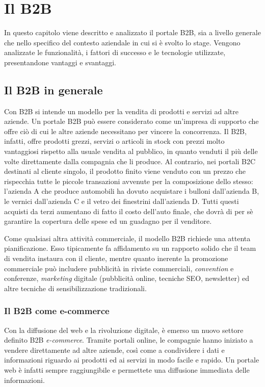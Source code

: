 \chapter{Il B2B}
\begin{flushright}
	\parbox{13cm}{\small In questo capitolo viene descritto e analizzato il portale B2B, sia a livello generale che nello specifico del contesto aziendale in cui si è svolto lo stage. Vengono analizzate le funzionalità, i fattori di successo e le tecnologie utilizzate, presentandone vantaggi e svantaggi.}
\end{flushright}
\section{Il B2B in generale}
Con B2B si intende un modello per la vendita di prodotti e servizi ad altre aziende. Un portale B2B può essere considerato come un'impresa di supporto che offre ciò di cui le altre aziende necessitano per vincere la concorrenza. Il B2B, infatti, offre prodotti grezzi, servizi o articoli in stock con prezzi molto vantaggiosi rispetto alla usuale vendita al pubblico, in quanto venduti il più delle volte direttamente dalla compagnia che li produce. Al contrario, nei portali B2C destinati al cliente singolo, il prodotto finito viene venduto con un prezzo che rispecchia tutte le piccole transazioni avvenute per la composizione dello stesso: l'azienda A che produce automobili ha dovuto acquistare i bulloni dall'azienda B, le vernici dall'azienda C e il vetro dei finestrini dall'azienda D. Tutti questi acquisti da terzi aumentano di fatto il costo dell'auto finale, che dovrà di per sè garantire la copertura delle spese ed un guadagno per il venditore.

Come qualsiasi altra attività commerciale, il modello B2B richiede una attenta pianificazione. Esso tipicamente fa affidamento su un rapporto solido che il team di vendita instaura con il cliente, mentre quanto inerente la promozione commerciale può includere pubblicità in riviste commerciali, \textit{convention} e conferenze, \textit{marketing} digitale (pubblicità online, tecniche SEO, newsletter) ed altre tecniche di sensibilizzazione tradizionali.

\subsection{Il B2B come e-commerce}
Con la diffusione del web e la rivoluzione digitale, è emerso un nuovo settore definito B2B \textit{e-commerce}. Tramite portali online, le compagnie hanno iniziato a vendere direttamente ad altre aziende, così come a condividere i dati e informazioni riguardo ai prodotti ed ai servizi in modo facile e rapido. Un portale web è infatti sempre raggiungibile e permettete una diffusione immediata
delle informazioni.

